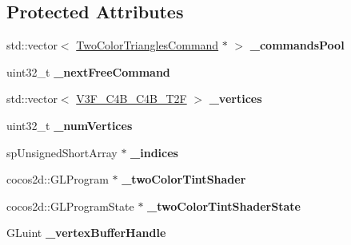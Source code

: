 \subsection*{Protected Attributes}
\begin{DoxyCompactItemize}
\item 
\mbox{\label{classspine_1_1SkeletonTwoColorBatch_a992a70745f110364b4eb257403960f6e}} 
std\+::vector$<$ \hyperlink{classspine_1_1TwoColorTrianglesCommand}{Two\+Color\+Triangles\+Command} $\ast$ $>$ {\bfseries \+\_\+commands\+Pool}
\item 
\mbox{\label{classspine_1_1SkeletonTwoColorBatch_a79cb7308f2d65f8424c65fb4bf9a6aab}} 
uint32\+\_\+t {\bfseries \+\_\+next\+Free\+Command}
\item 
\mbox{\label{classspine_1_1SkeletonTwoColorBatch_a6f309159ec389895ab3636126a6911d1}} 
std\+::vector$<$ \hyperlink{structspine_1_1V3F__C4B__C4B__T2F}{V3\+F\+\_\+\+C4\+B\+\_\+\+C4\+B\+\_\+\+T2F} $>$ {\bfseries \+\_\+vertices}
\item 
\mbox{\label{classspine_1_1SkeletonTwoColorBatch_a7c261cc1caf4b8e6ad9bce791c3983c4}} 
uint32\+\_\+t {\bfseries \+\_\+num\+Vertices}
\item 
\mbox{\label{classspine_1_1SkeletonTwoColorBatch_a1bdaa808c32f3309dc9ad7a236a9e887}} 
sp\+Unsigned\+Short\+Array $\ast$ {\bfseries \+\_\+indices}
\item 
\mbox{\label{classspine_1_1SkeletonTwoColorBatch_a8907ea1aa1638b09a1a0c6f31e20169c}} 
cocos2d\+::\+G\+L\+Program $\ast$ {\bfseries \+\_\+two\+Color\+Tint\+Shader}
\item 
\mbox{\label{classspine_1_1SkeletonTwoColorBatch_a020fcecf3e52138c2bc3b69ecce5e8dc}} 
cocos2d\+::\+G\+L\+Program\+State $\ast$ {\bfseries \+\_\+two\+Color\+Tint\+Shader\+State}
\item 
\mbox{\label{classspine_1_1SkeletonTwoColorBatch_a7c56ac3d1bed743f968d0cc269c059d5}} 
G\+Luint {\bfseries \+\_\+vertex\+Buffer\+Handle}

\end{DoxyCompactItemize}
